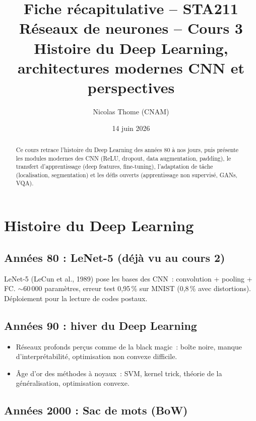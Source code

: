 \documentclass[a4paper,11pt]{article}
\title{\textbf{Fiche r\'ecapitulative -- STA211}\\[4pt]
\large R\'eseaux de neurones -- Cours 3 \\[2pt]
\small Histoire du Deep Learning, architectures modernes CNN
  et perspectives}
\author{Nicolas Thome (CNAM)}
\date{14 juin 2026}
\theoremstyle{definition}
\theoremstyle{remark}
\begin{document}
\maketitle
\thispagestyle{empty}

\begin{abstract}
Ce cours retrace l'histoire du Deep Learning des ann\'ees 80 \`a nos
jours, puis pr\'esente les modules modernes des CNN (ReLU, dropout,
data augmentation, padding), le transfert d'apprentissage (deep
features, fine-tuning), l'adaptation de t\^ache (localisation,
segmentation) et les d\'efis ouverts (apprentissage non supervis\'e,
GANs, VQA).
\end{abstract}

\vfill
\tableofcontents
\newpage

\section{Histoire du Deep Learning}

\subsection{Ann\'ees 80 : LeNet-5 (d\'ej\`a vu au cours 2)}

LeNet-5 (LeCun et al., 1989) pose les bases des CNN~:
convolution + pooling + FC. $\sim$60\,000 param\`etres, erreur
test 0,95\,\% sur MNIST (0,8\,\% avec distortions).
D\'eploiement pour la lecture de codes postaux.

\subsection{Ann\'ees 90 : hiver du Deep Learning}

\begin{itemize}
  \item R\'eseaux profonds per\c{c}us comme de la \og black
    magic\fg~: bo\^ite noire, manque d'interpr\'etabilit\'e,
    optimisation non convexe difficile.
  \item \^Age d'or des m\'ethodes \`a noyaux~: SVM, kernel trick,
    th\'eorie de la g\'en\'eralisation, optimisation convexe.
\end{itemize}

\subsection{Ann\'ees 2000 : Sac de mots (BoW)}
\end{document}
